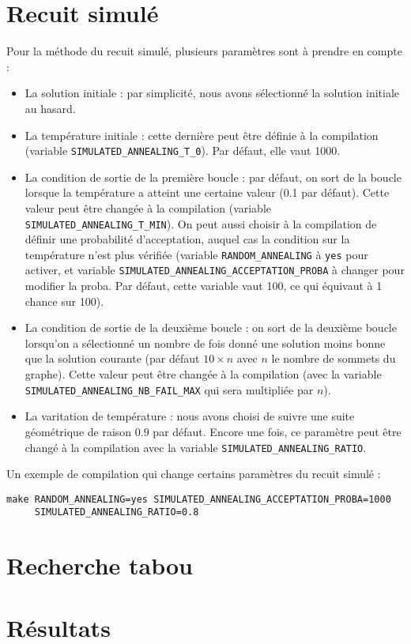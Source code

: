 \documentclass[12pt, a4paper]{article}
\begin{document}
\section{Recuit simulé}
Pour la méthode du recuit simulé, plusieurs paramètres sont à prendre en compte :
\begin{itemize}
\item La solution initiale : par simplicité, nous avons sélectionné la solution initiale au hasard.
\item La température initiale : cette dernière peut être définie à la compilation (variable \texttt{SIMULATED\_ANNEALING\_T\_0}). Par défaut, elle vaut 1000.
\item La condition de sortie de la première boucle : par défaut, on sort de la boucle lorsque la température a atteint une certaine valeur (0.1 par défaut). Cette valeur peut être changée à la compilation (variable \texttt{SIMULATED\_ANNEALING\_T\_MIN}). On peut aussi choisir à la compilation de définir une probabilité d'acceptation, auquel cas la condition sur la température n'est plus vérifiée (variable \texttt{RANDOM\_ANNEALING} à \texttt{yes} pour activer, et variable \texttt{SIMULATED\_ANNEALING\_ACCEPTATION\_PROBA} à changer pour modifier la proba. Par défaut, cette variable vaut 100, ce qui équivaut à 1 chance sur 100).
\item La condition de sortie de la deuxième boucle : on sort de la deuxième boucle lorsqu'on a sélectionné un nombre de fois donné une solution moins bonne que la solution courante (par défaut $10 \times n$ avec $n$ le nombre de sommets du graphe). Cette valeur peut être changée à la compilation (avec la variable \texttt{SIMULATED\_ANNEALING\_NB\_FAIL\_MAX} qui sera multipliée par $n$).
\item La varitation de température : nous avons choisi de suivre une suite géométrique de raison $0.9$ par défaut. Encore une fois, ce paramètre peut être changé à la compilation avec la variable \texttt{SIMULATED\_ANNEALING\_RATIO}.
\end{itemize}

Un exemple de compilation qui change certains paramètres du recuit simulé :
\begin{verbatim}
make RANDOM_ANNEALING=yes SIMULATED_ANNEALING_ACCEPTATION_PROBA=1000
     SIMULATED_ANNEALING_RATIO=0.8
\end{verbatim}
\section{Recherche tabou}

\section{Résultats}
\end{document}
